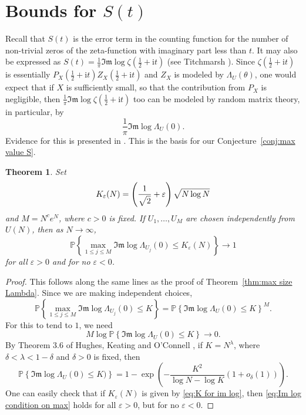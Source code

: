 \documentclass[10pt,reqno,twoside]{amsart}
\renewcommand{\i}{{\mathrm{i}}} %
\renewcommand{\Im}{{\mathfrak{Im}}}
\newcommand{\Prob}{\mathbb{P}}
\newtheorem{theorem}{Theorem}[section]
\numberwithin{equation}{section}
\numberwithin{theorem}{section}
\begin{document}
{{\section{Bounds for $S(t)$}\label{sect:S}


Recall that $S(t)$ is the error term in the counting function for
the number of non-trivial zeros of the zeta-function with imaginary part less
than $t$. It may also be expressed as
$S(t) = \frac{1}{\pi} \Im\log \zeta(\tfrac12+\i t)$ (see Titchmarsh \cite{Ti}).
Since $ \zeta(\frac12+\i t)$ is essentially $P_X(\frac12+\i t) Z_X(\frac12+\i t)$
and $Z_X$ is modeled by $ \Lambda_U(\theta)$,
one would expect that if $X$  is  sufficiently small, so that the contribution
from $P_X$ is negligible, then
 $\frac{1}{\pi} \Im\log \zeta(\tfrac12+\i t)$ too can
be modeled by random matrix theory, in particular, by
\begin{equation}
\frac{1}{\pi} \Im \log \Lambda_U(0).
\end{equation}
Evidence for this is presented in \cite{KeaSna}.  This is the basis for our
Conjecture~\ref{conj:max value S}.

\begin{theorem}\label{thm:im log Lambda}
Set
\begin{equation}\label{eq:K for im log}
K_\varepsilon(N)=\left(\frac{1}{\sqrt{\mathstrut 2}}+\varepsilon\right)
\sqrt{\mathstrut N\log N}
\end{equation}
and $M=N^c e^N$, where $c>0$ is fixed. If $U_1,\dots,U_M$ are
chosen independently from $U(N)$, then as $N\to\infty$,
\begin{equation}
\Prob\left\{ \max_{1\leq j \leq M} \Im \log \Lambda_{U_j}(0) \leq
K_\varepsilon(N) \right\} \to 1
\end{equation}
for all $\varepsilon>0$ and for no $\varepsilon<0$.
\end{theorem}


\begin{proof}
This follows along the same lines as the proof of
Theorem~\ref{thm:max size Lambda}. Since we are making independent
choices,
\begin{equation}
\Prob\left\{ \max_{1\leq j \leq M} \Im\log\Lambda_{U_j}(0) \leq K
\right\} = \Prob\left\{ \Im\log\Lambda_{U}(0) \leq K \right\}^M .
\end{equation}
For this to tend to $1$, we need
\begin{equation}\label{eq:Im log condition on max}
M \log \Prob\left\{ \Im\log\Lambda_{U}(0) \leq K \right\} \to 0 .
\end{equation}
By Theorem 3.6 of Hughes, Keating and O'Connell \cite{HKO2},
if $K=N^\lambda$, where $\delta<\lambda<1-\delta$ and
$\delta>0$ is fixed, then
\begin{equation}
\Prob\left\{ \Im\log\Lambda_{U}(0) \leq K) \right\}= 1 -
\exp\left(-\frac{K^2}{ \log N - \log K} \left(1+o_\delta(1)\right)
\right) .
\end{equation}
One can easily check that if $K_\varepsilon(N)$  is given by
\eqref{eq:K for im log}, then \eqref{eq:Im log condition on max}
holds for all $\varepsilon>0$, but for no $\varepsilon<0$.
\end{proof}

}}
\end{document}
